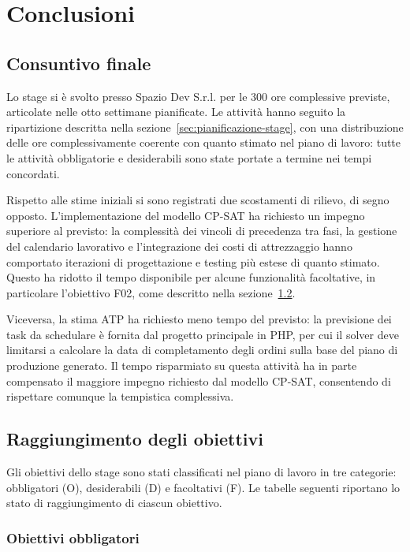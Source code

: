 \chapter{Conclusioni}
\label{chap:conclusioni}

\section{Consuntivo finale}
\label{sec:consuntivo}

Lo stage si è svolto presso Spazio Dev S.r.l. per le 300 ore complessive previste, articolate nelle otto settimane pianificate. Le attività hanno seguito la ripartizione descritta nella sezione~\ref{sec:pianificazione-stage}, con una distribuzione delle ore complessivamente coerente con quanto stimato nel piano di lavoro: tutte le attività obbligatorie e desiderabili sono state portate a termine nei tempi concordati.

Rispetto alle stime iniziali si sono registrati due scostamenti di rilievo, di segno opposto. L'implementazione del modello CP-SAT ha richiesto un impegno superiore al previsto: la complessità dei vincoli di precedenza tra fasi, la gestione del calendario lavorativo e l'integrazione dei costi di attrezzaggio hanno comportato iterazioni di progettazione e testing più estese di quanto stimato. Questo ha ridotto il tempo disponibile per alcune funzionalità facoltative, in particolare l'obiettivo F02, come descritto nella sezione~\ref{sec:raggiungimento-obiettivi}.

Viceversa, la stima ATP ha richiesto meno tempo del previsto: la previsione dei task da schedulare è fornita dal progetto principale in PHP, per cui il solver deve limitarsi a calcolare la data di completamento degli ordini sulla base del piano di produzione generato. Il tempo risparmiato su questa attività ha in parte compensato il maggiore impegno richiesto dal modello CP-SAT, consentendo di rispettare comunque la tempistica complessiva.

\section{Raggiungimento degli obiettivi}
\label{sec:raggiungimento-obiettivi}

Gli obiettivi dello stage sono stati classificati nel piano di lavoro in tre categorie: obbligatori (O), desiderabili (D) e facoltativi (F). Le tabelle seguenti riportano lo stato di raggiungimento di ciascun obiettivo.

\subsection{Obiettivi obbligatori}

